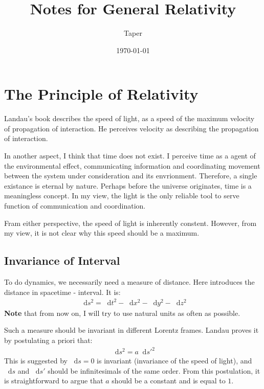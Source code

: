 \documentclass{article}
\title{Notes for General Relativity}
\date{\today}
\author{Taper}
\newcommand*\diff{\mathop{}\!\mathrm{d}}
\numberwithin{equation}{subsection} %
\theoremstyle{definition}
\begin{document}
\maketitle
{}
\tableofcontents
\section{The Principle of Relativity}
\label{sec:Principle_of_Relativity}
Landau's book \cite{landau} describes the speed of light, as a speed of the
maximum velocity of propagation of interaction. He perceives velocity as
describing the propagation of interaction.

In another aspect, I think that time does not exist. I perceive time as
a agent of the environmental effect, communicating information and 
coordinating movement between the system under consideration and its 
envrionment. Therefore, a single existance is eternal by nature. Perhaps 
before the universe originates, time is a meaningless concept. In my 
view, the light is the only reliable tool to serve function of
communication and coordination.

Fram either perspective, the speed of light is inherently constent.
However, from my view, it is not clear why this speed should be a maximum.

    \subsection{Invariance of Interval}
    \label{sec:Invariance of Interval}

    To do dynamics, we necessarily need a measure of distance. 
    Here introduces the distance in spacetime - interval. It is:
    \begin{align}
        \diff s^2 = \diff t^2 - \diff x^2 - \diff y^2 - \diff z^2
    \end{align}
    \textbf{Note} that from now on, I will try to use natural units
    as often as possible.

    Such a measure should be invariant in different Lorentz frames.
    Landau proves it by postulating a priori that:
    \begin{align}
        \diff s^2 = a \diff s'^2
    \end{align}
    This is suggested by $\diff s=0$ is invariant (invariance of the
    speed of light), and $\diff s$ and $\diff s'$ should be 
    infinitesimals of the same order. From this postulation, it is
    straightforward to argue that $a$ should be a constant and is
    equal to $1$.
\end{document}
